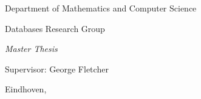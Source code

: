 \makeatletter
\let\thetitle\@title
\let\theauthor\@author
\let\thedate\@date
\makeatother

\begin{titlepage}
  \begin{center}
    \Large
    Department of Mathematics and Computer Science

    \Large
    Databases Research Group

    \vfill

    \Huge
    \textbf{\thetitle}

    \vspace*{0.25cm}

    \LARGE
    \textit{Master Thesis}

    \vfill

    \LARGE
    \theauthor

    \vfill

    \Large
    Supervisor: George Fletcher

    \vspace*{0.5cm}

    \Large
    Eindhoven, \thedate
  \end{center}
\end{titlepage}
